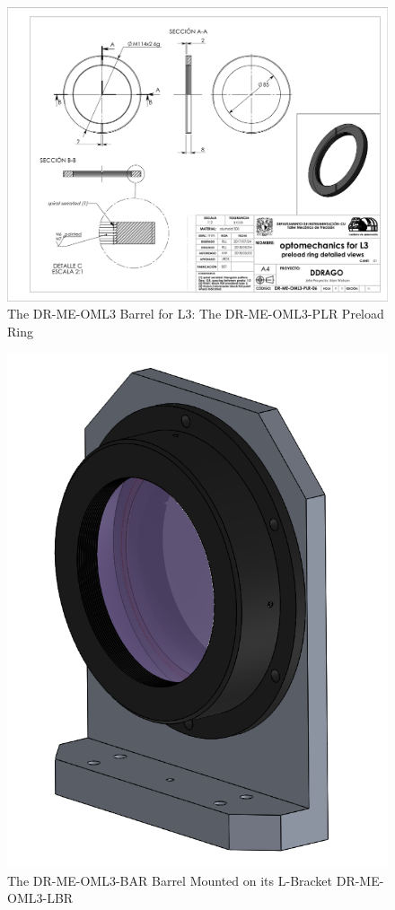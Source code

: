 \documentclass{article}
\begin{document}
\begin{figure}
\begin{center}
\includegraphics[height=\linewidth,angle=90]{figures/DR-ME-OML3-PLR-06}
\end{center}
\caption{The DR-ME-OML3 Barrel for L3: The DR-ME-OML3-PLR Preload Ring}
\label{figure:rosalia-oml3-plr}
\end{figure}

\begin{figure}
\begin{center}
\includegraphics[width=0.7\linewidth]{newfigures/OML3.png}
\end{center}
\caption{The DR-ME-OML3-BAR Barrel Mounted on its L-Bracket DR-ME-OML3-LBR}
\label{figure:rosalia-oml3-context}
\end{figure}
\end{document}
